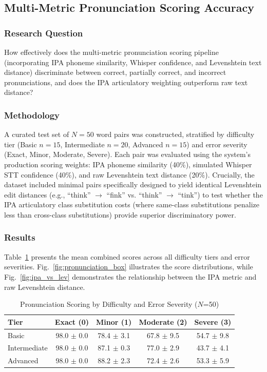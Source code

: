 \documentclass[conference]{IEEEtran}
\begin{document}
\subsection{Multi-Metric Pronunciation Scoring Accuracy}

\subsubsection{Research Question}
How effectively does the multi-metric pronunciation scoring pipeline (incorporating IPA phoneme similarity, Whisper confidence, and Levenshtein text distance) discriminate between correct, partially correct, and incorrect pronunciations, and does the IPA articulatory weighting outperform raw text distance?

\subsubsection{Methodology}
A curated test set of $N=50$ word pairs was constructed, stratified by difficulty tier (Basic $n=15$, Intermediate $n=20$, Advanced $n=15$) and error severity (Exact, Minor, Moderate, Severe). Each pair was evaluated using the system's production scoring weights: IPA phoneme similarity (40\%), simulated Whisper STT confidence (40\%), and raw Levenshtein text distance (20\%). Crucially, the dataset included minimal pairs specifically designed to yield identical Levenshtein edit distances (e.g., ``think'' $\rightarrow$ ``fink'' vs. ``think'' $\rightarrow$ ``tink'') to test whether the IPA articulatory class substitution costs (where same-class substitutions penalize less than cross-class substitutions) provide superior discriminatory power.

\subsubsection{Results}
Table~\ref{tab:pronunciation} presents the mean combined scores across all difficulty tiers and error severities. Fig.~\ref{fig:pronunciation_box} illustrates the score distributions, while Fig.~\ref{fig:ipa_vs_lev} demonstrates the relationship between the IPA metric and raw Levenshtein distance.

\begin{table}[!t]
\caption{Pronunciation Scoring by Difficulty and Error Severity ($N$=50)}
\label{tab:pronunciation}
\centering
\begin{tabular}{lcccc}
\toprule
\textbf{Tier} & \textbf{Exact (0)} & \textbf{Minor (1)} & \textbf{Moderate (2)} & \textbf{Severe (3)} \\
\midrule
Basic        & 98.0 $\pm$ 0.0 & 78.4 $\pm$ 3.1 & 67.8 $\pm$ 9.5 & 54.7 $\pm$ 9.8 \\
Intermediate & 98.0 $\pm$ 0.0 & 87.1 $\pm$ 0.3 & 77.0 $\pm$ 2.9 & 43.7 $\pm$ 4.1 \\
Advanced     & 98.0 $\pm$ 0.0 & 88.2 $\pm$ 2.3 & 72.4 $\pm$ 2.6 & 53.3 $\pm$ 5.9 \\
\bottomrule
\end{tabular}
\end{table}
\end{document}
